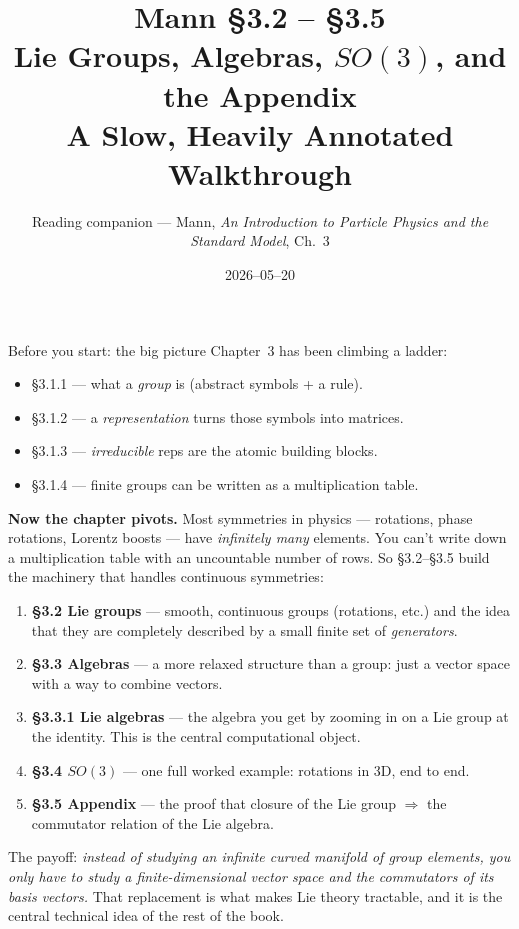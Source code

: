 \documentclass[11pt]{article}
\title{\textbf{Mann \S3.2 -- \S3.5}\\[2pt]
\Large Lie Groups, Algebras, $SO(3)$, and the Appendix\\[4pt]
\large A Slow, Heavily Annotated Walkthrough}
\author{Reading companion --- Mann, \emph{An Introduction to Particle Physics
and the Standard Model}, Ch.~3}
\date{2026--05--20}
\begin{document}
\maketitle

\begin{intuitionbox}{Before you start: the big picture}
Chapter~3 has been climbing a ladder:
\begin{itemize}[leftmargin=1.5em, itemsep=2pt]
  \item \S3.1.1 --- what a \emph{group} is (abstract symbols + a rule).
  \item \S3.1.2 --- a \emph{representation} turns those symbols into matrices.
  \item \S3.1.3 --- \emph{irreducible} reps are the atomic building blocks.
  \item \S3.1.4 --- finite groups can be written as a multiplication table.
\end{itemize}
\textbf{Now the chapter pivots.} Most symmetries in physics --- rotations,
phase rotations, Lorentz boosts --- have \emph{infinitely many} elements.
You can't write down a multiplication table with an uncountable number of
rows. So \S3.2--\S3.5 build the machinery that handles continuous symmetries:
\begin{enumerate}[leftmargin=1.5em, itemsep=2pt]
  \item \textbf{\S3.2 Lie groups} --- smooth, continuous groups (rotations,
    etc.) and the idea that they are completely described by a small finite
    set of \emph{generators}.
  \item \textbf{\S3.3 Algebras} --- a more relaxed structure than a group:
    just a vector space with a way to combine vectors.
  \item \textbf{\S3.3.1 Lie algebras} --- the algebra you get by zooming in
    on a Lie group at the identity. This is the central computational
    object.
  \item \textbf{\S3.4 $SO(3)$} --- one full worked example: rotations in
    3D, end to end.
  \item \textbf{\S3.5 Appendix} --- the proof that closure of the Lie
    group $\Rightarrow$ the commutator relation of the Lie algebra.
\end{enumerate}
The payoff: \emph{instead of studying an infinite curved manifold of group
elements, you only have to study a finite-dimensional vector space and the
commutators of its basis vectors.} That replacement is what makes Lie
theory tractable, and it is the central technical idea of the rest of the
book.
\end{intuitionbox}
\end{document}
